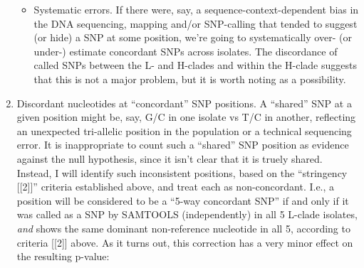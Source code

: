 \documentclass{article}\usepackage[]{graphicx}\usepackage[]{color}
\begin{document}
\begin{enumerate}
\begin{itemize}
    \item Systematic errors.  If there were, say, a sequence-context-dependent bias in the DNA sequencing, mapping and/or SNP-calling that tended to suggest (or hide) a SNP at some position, we're going to systematically over- (or under-) estimate concordant SNPs across isolates.  The discordance of called SNPs between the L- and H-clades and within the H-clade suggests that this is not a major problem, but it is worth noting as a possibility.
  \end{itemize}
  \item Discordant nucleotides at ``concordant'' SNP positions.  A ``shared'' SNP at a given position might be, say, G/C in one isolate vs T/C in another, reflecting an unexpected tri-allelic position in the population or a technical sequencing error.  It is inappropriate to count such a ``shared'' SNP position as evidence against the null hypothesis, since it isn't clear that it is truely shared.  Instead, I will identify such inconsistent positions, based on the ``stringency [[2]]'' criteria established above, and treat each as non-concordant.  I.e., a position will be considered to be a ``5-way concordant SNP'' if and only if it was called as a SNP by SAMTOOLS (independently) in all 5 L-clade isolates, \emph{and} shows the same dominant non-reference nucleotide in all 5, according to criteria [[2]] above.  As it turns out, this correction has a very minor effect on the resulting p-value:


\end{enumerate}
\end{document}

